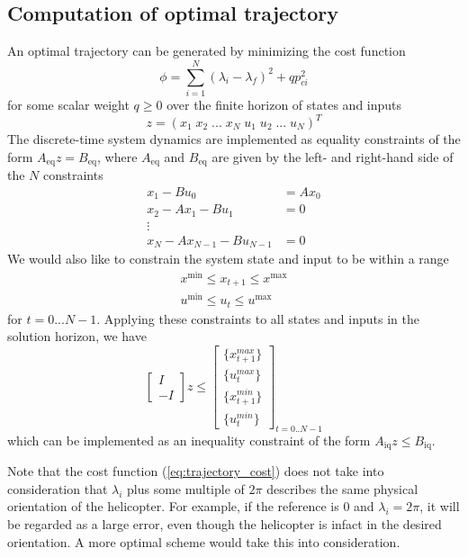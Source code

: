 \subsection{Computation of optimal trajectory}
An optimal trajectory can be generated by minimizing the cost function
\begin{equation}
	\label{eq:trajectory_cost}
	\phi = \sum_{i=1}^{N}(\lambda_i - \lambda_f)^2 + qp_{ci}^2
\end{equation}
for some scalar weight $q \geq 0$ over the finite horizon of states and inputs
\begin{equation}
	z = (x_1 \; x_2 \; ... \; x_N \; u_1 \; u_2 \; ... \; u_N)^T
\end{equation}
The discrete-time system dynamics are implemented as equality constraints of the form $A_{\text{eq}}z = B_{\text{eq}}$, where $A_{\text{eq}}$ and $B_{\text{eq}}$ are given by the left- and right-hand side of the $N$ constraints
\begin{align*}
	x_1 - Bu_0        &= Ax_0 \\
	x_2 - Ax_1 - Bu_1 &= 0    \\
	\vdots                    \\
	x_N - Ax_{N-1} - Bu_{N-1} &= 0
\end{align*}
We would also like to constrain the system state and input to be within a range
\begin{align}
	x^{\text{min}} \leq x_{t+1} \leq x^{\text{max}} \\
	u^{\text{min}} \leq u_t \leq u^{\text{max}}
\end{align}
for $t = 0...N-1$. Applying these constraints to all states and inputs in the solution horizon, we have
\begin{equation}
	\begin{bmatrix} I \\ -I \end{bmatrix} z
	\leq
	\begin{bmatrix}
	\{x_{t+1}^{max}\} \\
	\{u_t^{max}\} \\
	\{x_{t+1}^{min}\} \\
	\{u_t^{min}\}
	\end{bmatrix}_{t=0..N-1}
\end{equation}
which can be implemented as an inequality constraint of the form $A_{\text{iq}} z \leq B_{\text{iq}}$.

Note that the cost function (\ref{eq:trajectory_cost}) does not take into consideration that $\lambda_i$ plus some multiple of $2\pi$ describes the same physical orientation of the helicopter. For example, if the reference is $0$ and $\lambda_i = 2\pi$, it will be regarded as a large error, even though the helicopter is infact in the desired orientation. A more optimal scheme would take this into consideration.

